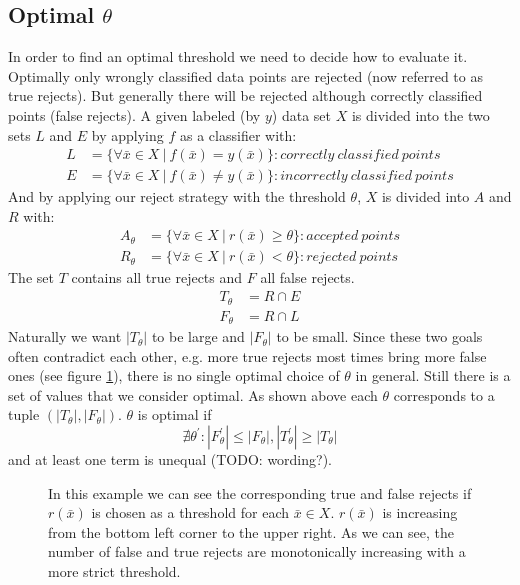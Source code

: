 \subsection{Optimal $\theta$}
\label{optimalt}
In order to find an optimal threshold we need to decide how to evaluate it. Optimally only wrongly classified data points are rejected (now referred to as true rejects). But generally there will be rejected although correctly classified points (false rejects). 
A given labeled (by $y$) data set $X$ is divided into the two sets $L$ and $E$ by applying $f$ as a classifier with:
\begin{align} 
L&=\{\forall \bar{x} \in X \ | \ f(\bar{x}) = y(\bar{x})\} : correctly \ classified \ points \\
E&=\{\forall \bar{x} \in X \ | \ f(\bar{x}) \neq y(\bar{x})\} : incorrectly \ classified \ points \end{align}
And by applying our reject strategy with the threshold $\theta$, $X$ is divided into $A$ and $R$ with:
\begin{align} 
A_\theta&=\{\forall \bar{x} \in X \ | \ r(\bar{x}) \geq \theta \} : accepted \ points \\
R_\theta&=\{\forall \bar{x} \in X \ | \ r(\bar{x}) < \theta\} : rejected \ points 
\end{align}
The set $T$ contains all true rejects and $F$ all false rejects.
\begin{align} 
T_\theta &= R \cap E \\ 
F_\theta &= R \cap L
\end{align}
Naturally we want $|T_\theta|$ to be large and $|F_\theta|$ to be small. Since these two goals often contradict each other, e.g. more true rejects most times bring more false ones (see figure \ref{incTaF}), there is no single optimal choice of $\theta$ in general. Still there is a set of values that we consider optimal. As shown above each $\theta$ corresponds to a tuple $(|T_\theta|,|F_\theta|)$. $\theta$ is optimal if
$$ \nexists \theta^{'} : |F_\theta^{'}|\leq|F_\theta|, |T_\theta^{'}|\geq|T_\theta| $$ and at least one term is unequal (TODO: wording?). 

\begin{figure}[!htbp]
\centering
\caption{In this example we can see the corresponding true and false rejects if $r(\bar{x})$ is chosen as a threshold for each $\bar{x} \in X$. $r(\bar{x})$ is increasing from the bottom left corner to the upper right. As we can see, the number of false and true rejects are monotonically increasing with a more strict threshold.}
\label{incTaF}
\end{figure}

